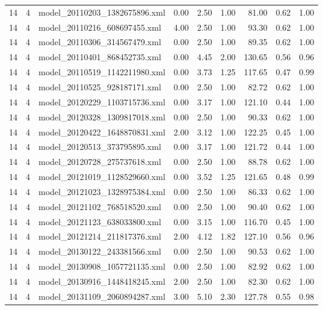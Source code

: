 \begin{table}[ht]
\begin{tabular}{rrlrrrrrr}
   14 &   4 & model\_20110203\_1382675896.xml & 0.00 & 2.50 & 1.00 & 81.00 & 0.62 & 1.00 \\ 
   14 &   4 & model\_20110216\_608697455.xml & 4.00 & 2.50 & 1.00 & 93.30 & 0.62 & 1.00 \\ 
   14 &   4 & model\_20110306\_314567479.xml & 0.00 & 2.50 & 1.00 & 89.35 & 0.62 & 1.00 \\ 
   14 &   4 & model\_20110401\_868452735.xml & 0.00 & 4.45 & 2.00 & 130.65 & 0.56 & 0.96 \\ 
   14 &   4 & model\_20110519\_1142211980.xml & 0.00 & 3.73 & 1.25 & 117.65 & 0.47 & 0.99 \\ 
   14 &   4 & model\_20110525\_928187171.xml & 0.00 & 2.50 & 1.00 & 82.72 & 0.62 & 1.00 \\ 
   14 &   4 & model\_20120229\_1103715736.xml & 0.00 & 3.17 & 1.00 & 121.10 & 0.44 & 1.00 \\ 
   14 &   4 & model\_20120328\_1309817018.xml & 0.00 & 2.50 & 1.00 & 90.33 & 0.62 & 1.00 \\ 
   14 &   4 & model\_20120422\_1648870831.xml & 2.00 & 3.12 & 1.00 & 122.25 & 0.45 & 1.00 \\ 
   14 &   4 & model\_20120513\_373795895.xml & 0.00 & 3.17 & 1.00 & 121.72 & 0.44 & 1.00 \\ 
   14 &   4 & model\_20120728\_275737618.xml & 0.00 & 2.50 & 1.00 & 88.78 & 0.62 & 1.00 \\ 
   14 &   4 & model\_20121019\_1128529660.xml & 0.00 & 3.52 & 1.25 & 121.65 & 0.48 & 0.99 \\ 
   14 &   4 & model\_20121023\_1328975384.xml & 0.00 & 2.50 & 1.00 & 86.33 & 0.62 & 1.00 \\ 
   14 &   4 & model\_20121102\_768518520.xml & 0.00 & 2.50 & 1.00 & 90.40 & 0.62 & 1.00 \\ 
   14 &   4 & model\_20121123\_638033800.xml & 0.00 & 3.15 & 1.00 & 116.70 & 0.45 & 1.00 \\ 
   14 &   4 & model\_20121214\_211817376.xml & 2.00 & 4.12 & 1.82 & 127.10 & 0.56 & 0.96 \\ 
   14 &   4 & model\_20130122\_243381566.xml & 0.00 & 2.50 & 1.00 & 90.53 & 0.62 & 1.00 \\ 
   14 &   4 & model\_20130908\_1057721135.xml & 0.00 & 2.50 & 1.00 & 82.92 & 0.62 & 1.00 \\ 
   14 &   4 & model\_20130916\_1448418245.xml & 2.00 & 2.50 & 1.00 & 82.30 & 0.62 & 1.00 \\ 
   14 &   4 & model\_20131109\_2060894287.xml & 3.00 & 5.10 & 2.30 & 127.78 & 0.55 & 0.98 \\ 

\end{tabular}
\end{table}
